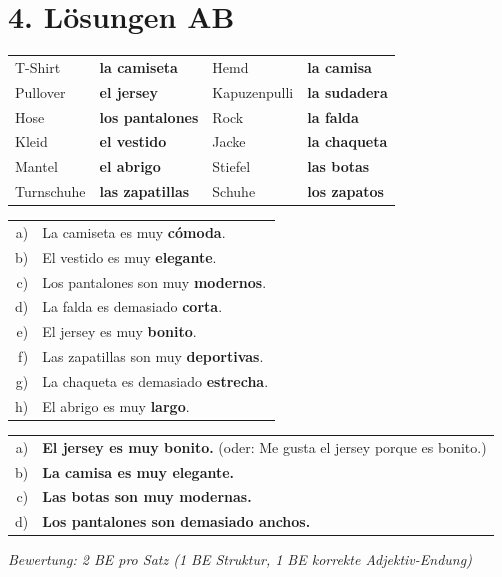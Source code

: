 \documentclass[11pt, a4paper]{article}
\newcommand{\lsg}[1]{\textcolor{loesung}{\textbf{#1}}}
\begin{document}

\section*{4. Lösungen AB}

\begin{loesungsbox}
\small
\begin{tabular}{ll@{\hspace{2cm}}ll}
T-Shirt & \lsg{la camiseta} & Hemd & \lsg{la camisa} \\
Pullover & \lsg{el jersey} & Kapuzenpulli & \lsg{la sudadera} \\
Hose & \lsg{los pantalones} & Rock & \lsg{la falda} \\
Kleid & \lsg{el vestido} & Jacke & \lsg{la chaqueta} \\
Mantel & \lsg{el abrigo} & Stiefel & \lsg{las botas} \\
Turnschuhe & \lsg{las zapatillas} & Schuhe & \lsg{los zapatos} \\
\end{tabular}
\end{loesungsbox}

\begin{loesungsbox}
\small
\begin{tabular}{@{}rl@{}}
a) & La camiseta es muy \lsg{cómoda}. \\
b) & El vestido es muy \lsg{elegante}. \\
c) & Los pantalones son muy \lsg{modernos}. \\
d) & La falda es demasiado \lsg{corta}. \\
e) & El jersey es muy \lsg{bonito}. \\
f) & Las zapatillas son muy \lsg{deportivas}. \\
g) & La chaqueta es demasiado \lsg{estrecha}. \\
h) & El abrigo es muy \lsg{largo}. \\
\end{tabular}
\end{loesungsbox}

\begin{loesungsbox}
\small
\begin{tabular}{@{}rl@{}}
a) & \lsg{El jersey es muy bonito.} (oder: Me gusta el jersey porque es bonito.) \\
b) & \lsg{La camisa es muy elegante.} \\
c) & \lsg{Las botas son muy modernas.} \\
d) & \lsg{Los pantalones son demasiado anchos.} \\
\end{tabular}

\textit{Bewertung: 2 BE pro Satz (1 BE Struktur, 1 BE korrekte Adjektiv-Endung)}
\end{loesungsbox}
\end{document}
